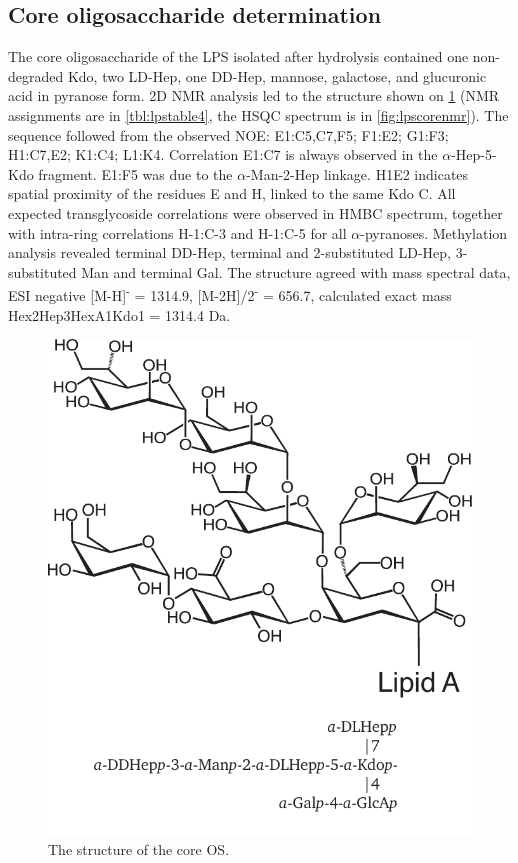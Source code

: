	\subsection{Core oligosaccharide determination} %
	\label{sub:core_oligosaccharide_determination}

		The core oligosaccharide of the \caulobacter{} \ac{LPS} isolated after  hydrolysis contained one non-degraded Kdo, two LD-Hep, one DD-Hep, mannose, galactose, and glucuronic acid in pyranose form. 2D \ac{NMR} analysis led to the structure shown on \cref{fig:lpscore} (\ac{NMR} assignments are in \cref{tbl:lpstable4}, the \ac{HSQC} spectrum is in \cref{fig:lpscorenmr}). The sequence followed from the observed \ac{NOE}: E1:C5,C7,F5; F1:E2; G1:F3; H1:C7,E2; K1:C4; L1:K4. Correlation E1:C7 is always observed in the $\alpha$-Hep-5-Kdo fragment. E1:F5 was due to the $\alpha$-Man-2-Hep linkage. H1E2 indicates spatial proximity of the residues E and H, linked to the same Kdo C. All expected transglycoside correlations were observed in \ac{HMBC} spectrum, together with intra-ring correlations H-1:C-3 and H-1:C-5 for all $\alpha$-pyranoses. Methylation analysis revealed terminal DD-Hep, terminal and 2-substituted LD-Hep, 3-substituted Man and terminal Gal. The structure agreed with mass spectral data, \ac{ESI} negative [M-H]\textsuperscript{-} = 1314.9, [M-2H]/2\textsuperscript{-} = 656.7, calculated exact mass Hex2Hep3HexA1Kdo1 = 1314.4 Da. 

		\begin{figure}[ph]
			\begin{center}
				\includegraphics[]{lps_chapter/img/lpscore.pdf}
			\end{center}
			\caption{The structure of the \caulobacter core \ac{OS}.}
			\label{fig:lpscore}
		\end{figure}

